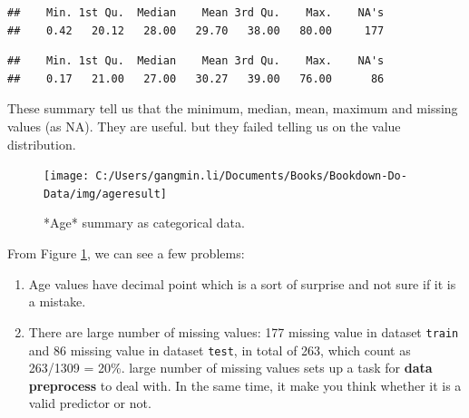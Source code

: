 \documentclass[
]{book}
\newenvironment{Shaded}{\begin{snugshade}}{\end{snugshade}}
\newcommand{\KeywordTok}[1]{\textcolor[rgb]{0.13,0.29,0.53}{\textbf{#1}}}
\newcommand{\NormalTok}[1]{#1}
\newcommand{\OperatorTok}[1]{\textcolor[rgb]{0.81,0.36,0.00}{\textbf{#1}}}
\begin{document}
\begin{Shaded}
\end{Shaded}

\begin{verbatim}
##    Min. 1st Qu.  Median    Mean 3rd Qu.    Max.    NA's 
##    0.42   20.12   28.00   29.70   38.00   80.00     177
\end{verbatim}

\begin{Shaded}
\end{Shaded}

\begin{verbatim}
##    Min. 1st Qu.  Median    Mean 3rd Qu.    Max.    NA's 
##    0.17   21.00   27.00   30.27   39.00   76.00      86
\end{verbatim}

These summary tell us that the minimum, median, mean, maximum and missing values (as NA). They are useful. but they failed telling us on the value distribution.

\begin{figure}

{\centering \texttt{[image: C:/Users/gangmin.li/Documents/Books/Bookdown-Do-Data/img/ageresult]} 

}

\caption{*Age* summary as categorical data.}\label{fig:ats}
\end{figure}

From Figure \ref{fig:ats}, we can see a few problems:

\begin{enumerate}
\def\labelenumi{\arabic{enumi}.}
\item
  Age values have decimal point which is a sort of surprise and not sure if it is a mistake.
\item
  There are large number of missing values: 177 missing value in dataset \texttt{train} and 86 missing value in dataset \texttt{test}, in total of 263, which count as 263/1309 = 20\%. large number of missing values sets up a task for \textbf{data preprocess} to deal with. In the same time, it make you think whether it is a valid predictor or not.
\end{enumerate}
\end{document}
